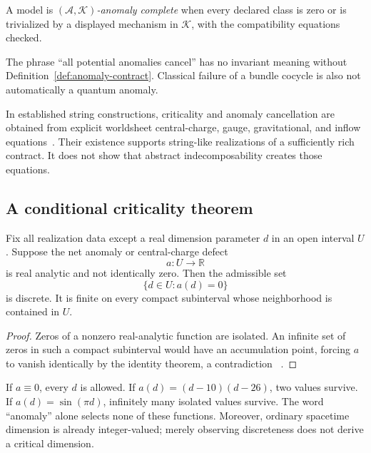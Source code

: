 \documentclass[11pt]{article}
\newcommand{\Anom}{\mathcal A}
\newcommand{\Mechanisms}{\mathcal K}
\begin{document}
\begin{definition}
A model is \emph{$(\Anom,\Mechanisms)$-anomaly complete} when every declared
class is zero or is trivialized by a displayed mechanism in $\Mechanisms$,
with the compatibility equations checked.
\end{definition}

The phrase ``all potential anomalies cancel'' has no invariant meaning without
Definition~\ref{def:anomaly-contract}.  Classical failure of a bundle cocycle
is also not automatically a quantum anomaly.

In established string constructions, criticality and anomaly cancellation are
obtained from explicit worldsheet central-charge, gauge, gravitational, and
inflow equations~\cite{Polchinski,AlvarezGaumeWitten,GreenSchwarz}.  Their
existence supports string-like realizations of a sufficiently rich contract.
It does not show that abstract indecomposability creates those equations.

\subsection{A conditional criticality theorem}

\begin{theorem}\label{thm:critical}
Fix all realization data except a real dimension parameter $d$ in an open
interval $U$.  Suppose the net anomaly or central-charge defect
\[
 a:U\longrightarrow\mathbb R
\]
is real analytic and not identically zero.  Then the admissible set
\[
 \{d\in U:a(d)=0\}
\]
is discrete.  It is finite on every compact subinterval whose neighborhood is
contained in $U$.
\end{theorem}

\begin{proof}
Zeros of a nonzero real-analytic function are isolated.  An infinite set of
zeros in such a compact subinterval would have an accumulation point, forcing
$a$ to vanish identically by the identity theorem, a contradiction
~\cite{KrantzParks}.
\end{proof}

\begin{remark}
If $a\equiv0$, every $d$ is allowed.  If
$a(d)=(d-10)(d-26)$, two values survive.  If
$a(d)=\sin(\pi d)$, infinitely many isolated values survive.  The word
``anomaly'' alone selects none of these functions.  Moreover, ordinary
spacetime dimension is already integer-valued; merely observing discreteness
does not derive a critical dimension.
\end{remark}
\end{document}
